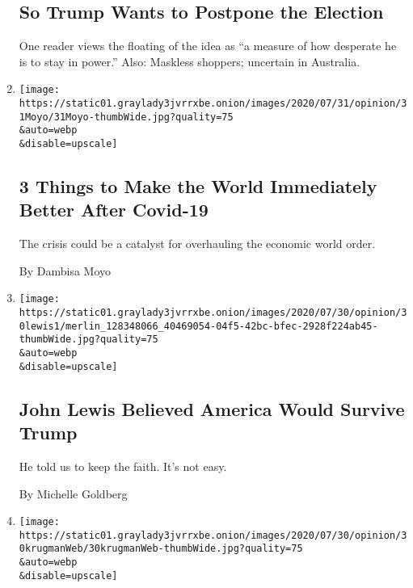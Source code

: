 \begin{enumerate}
  \hypertarget{so-trump-wants-to-postpone-the-election}{%
  \subsection{So Trump Wants to Postpone the
  Election}\label{so-trump-wants-to-postpone-the-election}}

  One reader views the floating of the idea as ``a measure of how
  desperate he is to stay in power.'' Also: Maskless shoppers; uncertain
  in Australia.
\item
  \href{/2020/07/31/opinion/coronavirus-economy.html}{}

  \texttt{[image: https://static01.graylady3jvrrxbe.onion/images/2020/07/31/opinion/31Moyo/31Moyo-thumbWide.jpg?quality=75\\\&auto=webp\\\&disable=upscale]}

  \hypertarget{3-things-to-make-the-world-immediately-better-after-covid-19}{%
  \subsection{3 Things to Make the World Immediately Better After
  Covid-19}\label{3-things-to-make-the-world-immediately-better-after-covid-19}}

  The crisis could be a catalyst for overhauling the economic world
  order.

  By Dambisa Moyo
\item
  \href{/2020/07/30/opinion/john-lewis-legacy.html}{}

  \texttt{[image: https://static01.graylady3jvrrxbe.onion/images/2020/07/30/opinion/30lewis1/merlin\_128348066\_40469054-04f5-42bc-bfec-2928f224ab45-thumbWide.jpg?quality=75\\\&auto=webp\\\&disable=upscale]}

  \hypertarget{john-lewis-believed-america-would-survive-trump}{%
  \subsection{John Lewis Believed America Would Survive
  Trump}\label{john-lewis-believed-america-would-survive-trump}}

  He told us to keep the faith. It's not easy.

  By Michelle Goldberg
\item
  \href{/2020/07/30/opinion/trump-coronavirus-economy.html}{}

  \texttt{[image: https://static01.graylady3jvrrxbe.onion/images/2020/07/30/opinion/30krugmanWeb/30krugmanWeb-thumbWide.jpg?quality=75\\\&auto=webp\\\&disable=upscale]}


\end{enumerate}
